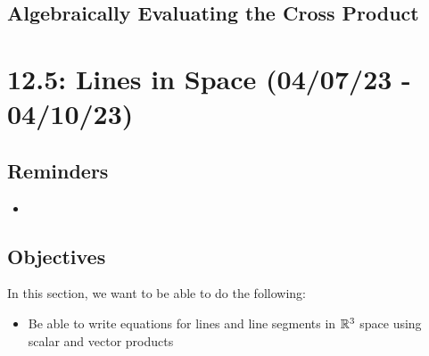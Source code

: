 \documentclass{report}
\begin{document}
\begin{sloppypar}
\section{Algebraically Evaluating the Cross Product}
\begin{center}
\end{center}

\chapter{12.5: Lines in Space (04/07/23 - 04/10/23)}
\section{Reminders}
\begin{itemize}
        \item
\end{itemize}

\section{Objectives}
In this section, we want to be able to do the
following:
\begin{itemize}
  \item Be able to write equations for lines
        and line segments in $ \mathbb{R}^{3} $ space
        using scalar and vector products
\end{itemize}


\end{sloppypar}
\end{document}
